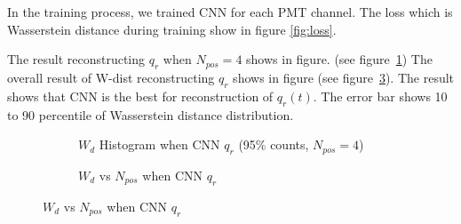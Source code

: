 In the training process, we trained CNN for each PMT channel. The loss which is Wasserstein distance during training show in figure \ref{fig:loss}. 

The result reconstructing $q_{r}$ when $N_{pos}=4$ shows in figure. (see figure~\ref{fig:cnn-hist}) The overall result of W-dist reconstructing $q_{r}$ shows in figure (see figure~\ref{fig:cnn-npos}). The result shows that CNN is the best for reconstruction of $q_{r}(t)$. The error bar shows 10 to 90 percentile of Wasserstein distance distribution. 

\begin{figure}[H]
\begin{minipage}[t]{.5\textwidth}
\begin{figure}[H]
    \centering
    \resizebox{\textwidth}{!}{}
    \caption{\label{fig:cnn-hist} $W_{d}$ Histogram when CNN $q_{r}$ (95\% counts, $N_{pos}=4$)}
\end{figure}
\end{minipage}
\begin{minipage}[t]{.5\textwidth}
\begin{figure}[H]
    \centering
    \resizebox{\textwidth}{!}{}
    \caption{\label{fig:cnn-npos}$W_{d}$ vs $N_{pos}$ when CNN $q_{r}$}
\end{figure}
\end{minipage}
\end{figure}


